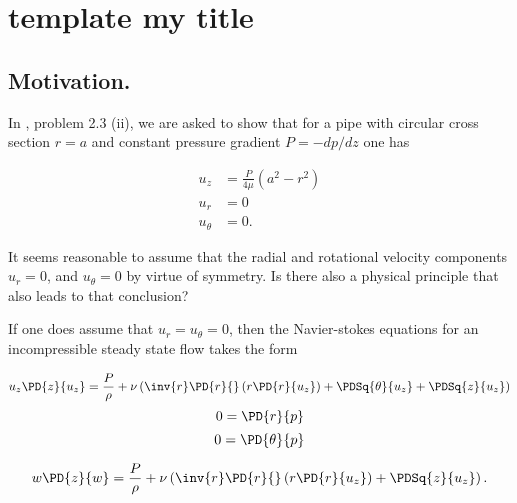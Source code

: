 
%

\chapter{template my title}
\label{chap:template}
{}
\date{Feb 28, 2012}

\beginArtWithToc

\section{Motivation.}

In \cite{acheson1990elementary}, problem 2.3 (ii), we are asked to show that for a pipe with circular cross section $r = a$ and constant pressure gradient $P = -dp/dz$ one has

\begin{align*}%
u_z &= \frac{P}{4 \mu}\left( a^2 - r^2 \right) \\
u_r &= 0 \\
u_\theta &= 0.
\end{align*}

It seems reasonable to assume that the radial and rotational velocity components $u_r = 0$, and $u_\theta = 0$ by virtue of symmetry.  Is there also a physical principle that also leads to that conclusion?

If one does assume that $u_r = u_\theta = 0$, then the Navier-stokes equations for an incompressible steady state flow takes the form

\begin{equation*}%
u_z \PD{z}{u_z} = \frac{P}{\rho} 
+ \nu \left(
\inv{r} 
\PD{r}{}\left(r \PD{r}{u_z} \right) + \PDSq{\theta}{u_z} + \PDSq{z}{u_z}
\right)
\end{equation*}
\begin{equation*}%
0 = \PD{r}{p}
\end{equation*}
\begin{equation*}%
0 = \PD{\theta}{p}
\end{equation*}

\begin{equation*}
w \PD{z}{w} = \frac{P}{\rho} 
+ \nu \left(
\inv{r} 
\PD{r}{}\left(r \PD{r}{u_z} \right) + \PDSq{z}{u_z}
\right).
\end{equation*}

